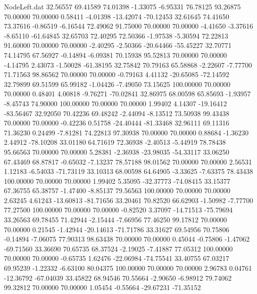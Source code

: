 \begin{filecontents}{NodeLeft.dat}
  32.56557   69.41589   74.01398    -1.33075   -6.95331   76.78125   93.26875   70.00000   70.00000    0.58411   -4.01398  -13.42074  -70.12453
  32.61645   74.41650   73.37616    -0.86519   -6.16544   72.49062   91.75000   70.00000   70.00000   -4.41650   -3.37616   -8.65110  -61.64845
  32.65703   72.40295   72.50366    -1.97538   -5.30594   72.22813   91.60000   70.00000   70.00000   -2.40295   -2.50366  -20.64466  -55.45227
  32.70771   74.14795   67.56927    -0.14894   -6.09381   70.15938   95.52813   70.00000   70.00000   -4.14795    2.43073   -1.50028  -61.38195
  32.75842   70.79163   65.58868    -2.22607   -7.77700   71.71563   98.86562   70.00000   70.00000   -0.79163    4.41132  -20.65085  -72.14592
  32.79899   69.51599   65.99182    -1.04426   -7.49050   73.15625  100.00000   70.00000   70.00000    0.48401    4.00818   -9.76271  -70.02841
  32.86975   68.00598   65.85693    -1.93957   -8.45743   74.90000  100.00000   70.00000   70.00000    1.99402    4.14307  -19.16412  -83.56467
  32.92050   70.42236   69.48242    -2.44094   -8.13512   73.50938   99.43438   70.00000   70.00000   -0.42236    0.51758  -24.40444  -81.33468
  32.96111   69.11316   71.36230     0.24499   -7.81281   74.22813   97.30938   70.00000   70.00000    0.88684   -1.36230    2.44912  -78.10208
  33.01180   64.71619   72.36938    -2.40513   -5.44919   78.78438   95.66563   70.00000   70.00000    5.28381   -2.36938  -23.98035  -54.33117
  33.06250   67.43469   68.87817    -0.65032   -7.13237   78.57188   98.01562   70.00000   70.00000    2.56531    1.12183   -6.54033  -71.73119
  33.10313   68.00598   64.64905    -3.33625   -7.63375   78.43438  100.00000   70.00000   70.00000    1.99402    5.35095  -32.37773  -74.08415
  33.15377   67.36755   65.38757    -1.47400   -8.85137   79.56563  100.00000   70.00000   70.00000    2.63245    4.61243  -13.60813  -81.71656
  33.20461   70.82520   66.62903    -1.50982   -7.77700   77.27500  100.00000   70.00000   70.00000   -0.82520    3.37097  -14.71513  -75.79694
  33.26563   69.78455   71.42944    -2.15444   -7.66956   77.46250   99.17812   70.00000   70.00000    0.21545   -1.42944  -20.14613  -71.71786
  33.31627   69.54956   70.75806    -0.14894   -7.06075   77.90313   98.63438   70.00000   70.00000    0.45044   -0.75806   -1.47062  -69.71560
  33.36690   70.65735   68.37524    -2.19025   -7.41887   77.05312  100.00000   70.00000   70.00000   -0.65735    1.62476  -22.06984  -74.75541
  33.40755   67.03217   69.95239    -1.22332   -6.63100   80.04375  100.00000   70.00000   70.00000    2.96783    0.04761  -12.36792  -67.04039
  33.45822   68.94546   70.55664    -2.90650   -6.98912   79.74062   99.32812   70.00000   70.00000    1.05454   -0.55664  -29.67231  -71.35152

\end{filecontents}
